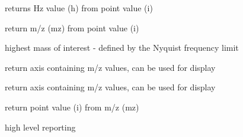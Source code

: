 \documentclass[letterpaper,10pt,openany,oneside]{sphinxmanual}
\begin{document}
\begin{fulllineitems}
\begin{fulllineitems}
\end{fulllineitems}


\begin{fulllineitems}
\label{rst/code:FTICR.FTICRAxis.itoh}
returns Hz value (h) from point value (i)

\end{fulllineitems}


\begin{fulllineitems}
\label{rst/code:FTICR.FTICRAxis.itomz}
return m/z (mz) from point value (i)

\end{fulllineitems}


\begin{fulllineitems}
\label{rst/code:FTICR.FTICRAxis.lowmass}
highest mass of interest - defined by the Nyquist frequency limit

\end{fulllineitems}


\begin{fulllineitems}
\label{rst/code:FTICR.FTICRAxis.mass_axis}
return axis containing m/z values, can be used for display

\end{fulllineitems}


\begin{fulllineitems}
\label{rst/code:FTICR.FTICRAxis.mz_axis}
return axis containing m/z values, can be used for display

\end{fulllineitems}


\begin{fulllineitems}
\label{rst/code:FTICR.FTICRAxis.mztoi}
return point value (i) from  m/z (mz)

\end{fulllineitems}


\begin{fulllineitems}
\label{rst/code:FTICR.FTICRAxis.report}
high level reporting

\end{fulllineitems}


\end{fulllineitems}
\end{document}
